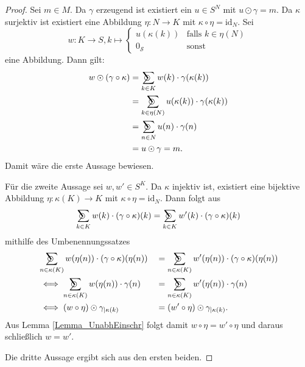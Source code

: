 \documentclass{article}
\DeclareMathOperator*{\sumcirc}{%
  \ThisStyle{\mathop{\ensurestackMath{\stackinset{c}{-1.5\LMpt}{c}{}{%
  \rotatebox[origin=lb]{-90}{$\SavedStyle\scalerel*{\bm\Circle}{%
  i}$}}{\SavedStyle\sum}}}}}
\begin{document}
\begin{proof}
  Sei $m \in M$. 
  Da $\gamma$ erzeugend ist existiert ein $u \in S^N$ mit $u \odot \gamma = m$.
  Da $\kappa$ surjektiv ist existiert eine Abbildung $\eta \colon N \to K$
  mit $\kappa \circ \eta = \text{id}_N$.
  Sei
  \begin{equation*}
    w \colon K \to S, k \mapsto
    \begin{cases}
      u(\kappa(k)) & \text{falls } k \in \eta(N) \\
      0_\mathcal{S} & \text{sonst}
    \end{cases}  
  \end{equation*}
  eine Abbildung.
  Dann gilt:
  \begin{align*}
    w \odot (\gamma \circ \kappa) 
    &= \sumcirc_{k \in K}w(k) \cdot \gamma(\kappa(k)) \\
    &= \sumcirc_{k \in \eta(N)}u(\kappa(k)) \cdot \gamma(\kappa(k)) \\
    &= \sumcirc_{n \in N} u(n) \cdot \gamma(n) \\
    &= u \odot \gamma = m.
  \end{align*}
  Damit wäre die erste Aussage bewiesen.

  Für die zweite Aussage sei $w, w' \in S^K$.
  Da $\kappa$ injektiv ist, existiert eine bijektive Abbildung $\eta \colon \kappa(K) \to K$
  mit $\kappa \circ \eta = \text{id}_N$.
  Dann folgt aus
  \begin{equation*}
    \sumcirc_{k \in K} w(k) \cdot (\gamma \circ \kappa)(k) = \sumcirc_{k \in K} w'(k) \cdot (\gamma \circ \kappa)(k)
  \end{equation*}
  mithilfe des Umbenennungssatzes
  \begin{alignat*}{2}
    &\sumcirc_{n \in \kappa(K)} w(\eta(n)) \cdot (\gamma \circ \kappa)(\eta(n)) &&= \sumcirc_{n \in \kappa(K)} w'(\eta(n)) \cdot (\gamma \circ \kappa)(\eta(n)) \\
    &\iff \sumcirc_{n \in \kappa(K)} w(\eta(n)) \cdot \gamma(n) &&= \sumcirc_{n \in \kappa(K)} w'(\eta(n)) \cdot \gamma(n) \\
    &\iff (w \circ \eta) \odot \gamma_{\mid \kappa(k)} &&= (w' \circ \eta) \odot \gamma_{\mid \kappa(k)}.
  \end{alignat*}
  Aus Lemma \ref{Lemma_UnabhEinschr} folgt damit $w \circ \eta = w' \circ \eta$
  und daraus schließlich $w = w'$.

  Die dritte Aussage ergibt sich aus den ersten beiden.
\end{proof}
\end{document}
